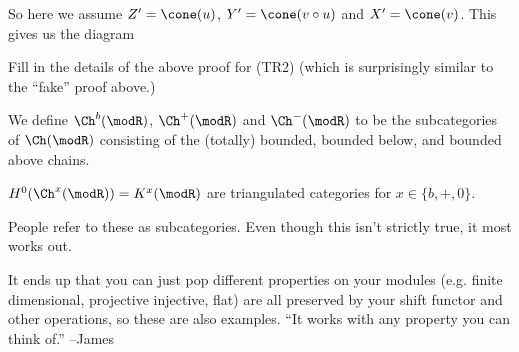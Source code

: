 \documentclass[12pt]{article}
\begin{document}
\begin{ex}
	So here we assume $Z'=\cone(u)$, $Y'=\cone(v\circ u)$ and $X'=\cone(v)$. This gives us the diagram
	\begin{center}
	\end{center}
\end{ex}
\begin{prob}
	Fill in the details of the above proof for (TR2) (which is surprisingly similar to the ``fake'' proof above.)
\end{prob}

\begin{defn}
	We define $\Ch^b(\modR)$, $\Ch^+(\modR)$ and $\Ch^-(\modR)$ to be the subcategories of $\Ch(\modR)$ consisting 
	of the (totally) bounded, bounded below, and bounded above chains.
\end{defn}

\begin{prop}
	$H^0(\Ch^x(\modR))=K^x(\modR)$ are triangulated categories for $x\in\{b,+,0\}$. 
\end{prop}
\begin{rmk}
	People refer to these as 
	subcategories. Even though this isn't strictly true, it most works out.
\end{rmk}
\begin{rmk}
	It ends up that you can just pop different properties on your modules (e.g. finite dimensional, projective injective, flat)
	are all preserved by your shift functor and other operations, so these are also examples. ``It works with any 
	property you can think of.'' --James
\end{rmk}
\end{document}
